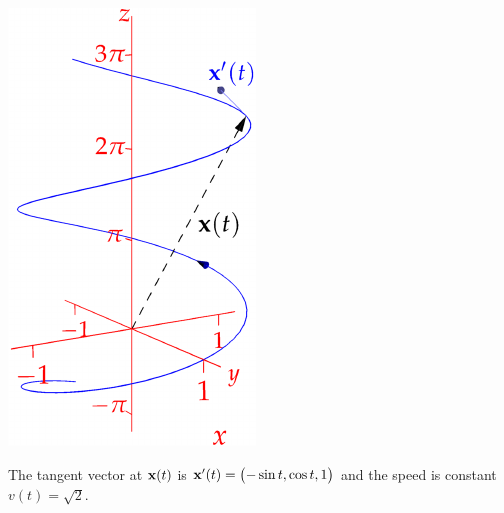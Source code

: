 \begin{tcolorbox}[exstyle,title={}]
\begin{description}
\begin{minipage}[t]{0.72\linewidth}
\end{minipage}\hfill\begin{minipage}[t]{0.27\linewidth}\vspace{0pt}
	\flushright\href{http://www.math.uci.edu/~ndonalds/math162a/curves-helixnew.html}{\includegraphics{curves-helixnew}}
\end{minipage}\par
	The tangent vector at ${\mathbf{x}}(t)$ is ${\mathbf{x}}'(t)=\bigl(-\sin t,\cos t,1\bigr)$ and the speed is constant $v(t)=\sqrt 2$.


\end{description}
\end{tcolorbox}
